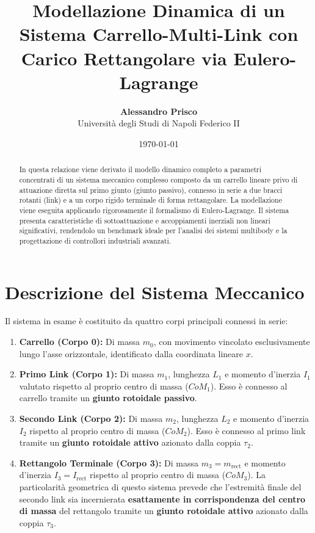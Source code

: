 \documentclass[11pt,a4paper]{article}
\title{\textbf{Modellazione Dinamica di un Sistema Carrello-Multi-Link con Carico Rettangolare via Eulero-Lagrange}}
\author{\textbf{Alessandro Prisco} \\ Università degli Studi di Napoli Federico II}
\date{\today}
\begin{document}
	
	\maketitle
	
	\begin{abstract}
		In questa relazione viene derivato il modello dinamico completo a parametri concentrati di un sistema meccanico complesso composto da un carrello lineare privo di attuazione diretta sul primo giunto (giunto passivo), connesso in serie a due bracci rotanti (link) e a un corpo rigido terminale di forma rettangolare. La modellazione viene eseguita applicando rigorosamente il formalismo di Eulero-Lagrange. Il sistema presenta caratteristiche di sottoattuazione e accoppiamenti inerziali non lineari significativi, rendendolo un benchmark ideale per l'analisi dei sistemi multibody e la progettazione di controllori industriali avanzati.
	\end{abstract}
	
	\section{Descrizione del Sistema Meccanico}
	Il sistema in esame è costituito da quattro corpi principali connessi in serie:
	\begin{enumerate}
		\item \textbf{Carrello (Corpo 0):} Di massa $m_0$, con movimento vincolato esclusivamente lungo l'asse orizzontale, identificato dalla coordinata lineare $x$.
		\item \textbf{Primo Link (Corpo 1):} Di massa $m_1$, lunghezza $L_1$ e momento d'inerzia $I_1$ valutato rispetto al proprio centro di massa ($CoM_1$). Esso è connesso al carrello tramite un \textbf{giunto rotoidale passivo}.
		\item \textbf{Secondo Link (Corpo 2):} Di massa $m_2$, lunghezza $L_2$ e momento d'inerzia $I_2$ rispetto al proprio centro di massa ($CoM_2$). Esso è connesso al primo link tramite un \textbf{giunto rotoidale attivo} azionato dalla coppia $\tau_2$.
		\item \textbf{Rettangolo Terminale (Corpo 3):} Di massa $m_3 = m_{\text{rect}}$ e momento d'inerzia $I_3 = I_{\text{rect}}$ rispetto al proprio centro di massa ($CoM_3$). La particolarità geometrica di questo sistema prevede che l'estremità finale del secondo link sia incernierata \textbf{esattamente in corrispondenza del centro di massa} del rettangolo tramite un \textbf{giunto rotoidale attivo} azionato dalla coppia $\tau_3$.
	\end{enumerate}
	
\end{document}
